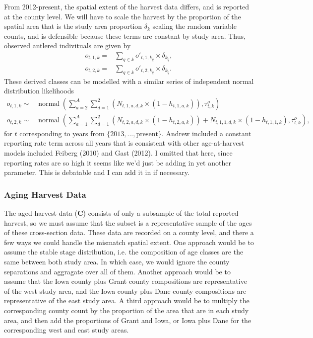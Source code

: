 \documentclass[12pt]{article}\usepackage[]{graphicx}\usepackage[]{color}
\DeclareMathOperator{\dnorm}{normal}
\begin{document}
From 2012-present, the spatial extent of the harvest data differs, and is reported at the county level. We will have to scale the harvest by the proportion of the spatial area that is the study area proportion $\delta_k$ scaling the random variable counts, and is defensible because these terms are constant by study area. Thus, observed antlered indivituals are given by 
\begin{align}
o_{t,1,k} = & \sum_{q \in k} o'_{t,1,k_q} \times \delta_{k_q},\\ 
o_{t,2,k} = & \sum_{q \in k} o'_{t,2,k_q} \times \delta_{k_q}. 
\end{align}
These derived classes can be modelled with a similar series of independent normal distribution likelihoods
\begin{align}
o_{t,1,k}\sim & \dnorm(\sum_{a=2}^A \sum_{d=1}^2 \left(N_{t,1,a,d,k}\times(1-h_{t,1,a,k})\right),\tau_{t,k}^o)\\
o_{t,2,k} \sim & \dnorm(\sum_{a=1}^A \sum_{d=1}^2 \left(N_{t,2,a,d,k}\times(1-h_{t,2,a,k})\right) + N_{t,1,1,d,k}\times(1-h_{t,1,1,k}),\tau_{t,k}^o),
\end{align} 
    \noindent  for $t$ corresponding to years from $\{2013,...,\text{present}\}$. Andrew included a constant reporting rate term across all years that is consistent with other age-at-harvest models included Feiberg (2010) and Gast (2012). I omitted that here, since reporting rates are so high it seems like we'd just be adding in yet another parameter. This is debatable and I can add it in if necessary.

\subsubsection{Aging Harvest Data}
The aged harvest data ($\bm{C}$) consists of only a subsample of the total reported harvest, so we must assume that the subset is a representative sample of the ages of these cross-section data. These data are recorded on a county level, and there a few ways we could handle the mismatch spatial extent. One approach would be to assume the stable stage distribution, i.e. the composition of age classes are the same between both study area. In which case, we would ignore the county separations and aggragate over all of them. Another approach would be to assume that the Iowa county plus Grant county compositions are representative of the west study area, and the Iowa county plus Dane county compositions are representative of the east study area. A third approach would be to multiply the corresponding county count by the proportion of the area that are in each study area, and then add the proportions of Grant and Iowa, or Iowa plus Dane for the corresponding west and east study areas. 
\end{document}
